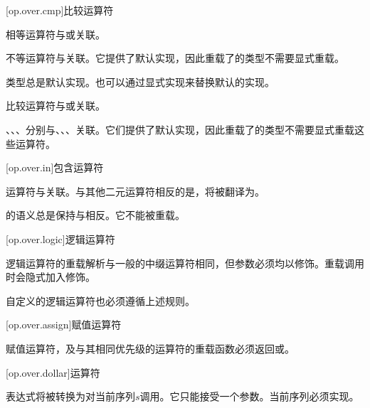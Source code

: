 [op.over.cmp]{比较运算符}

\pnum
相等运算符\tcode{==}与或关联。

\pnum
不等运算符\tcode{!=}与关联。它提供了默认实现，因此重载了\tcode{==}的类型不需要显式重载\tcode{!=}。

\pnum
类型总是默认实现。也可以通过显式实现来替换默认的实现。

\pnum
比较运算符与或关联。

\pnum
\tcode{<}、\tcode{<=}、\tcode{>}、\tcode{>=}分别与、、、关联。它们提供了默认实现，因此重载了的类型不需要显式重载这些运算符。

[op.over.in]{包含运算符}

\pnum
{}运算符与关联。与其他二元运算符相反的是，将被翻译为。

\pnum
{}的语义总是保持与相反。它不能被重载。

[op.over.logic]{逻辑运算符}

\pnum
逻辑运算符的重载解析与一般的中缀运算符相同，但参数必须均以修饰。重载调用时会隐式加入修饰。

\pnum
自定义的逻辑运算符也必须遵循上述规则。

[op.over.assign]{赋值运算符}

\pnum
赋值运算符，及与其相同优先级的运算符的重载函数必须返回或。

[op.over.dollar]{\tcode{\$}运算符}

\pnum
\tcode{\$}表达式将被转换为对当前序列$s$调用。它只能接受一个参数。当前序列必须实现。

